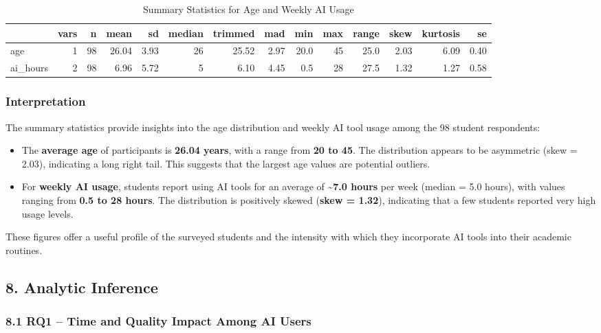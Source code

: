 \documentclass[
]{article}
\providecommand{\tightlist}{%
  \setlength{\itemsep}{0pt}\setlength{\parskip}{0pt}}
\begin{document}
\begin{longtable}[t]{lrrrrrrrrrrrrr}
\caption{\label{tab:descriptive-stats}Summary Statistics for Age and Weekly AI Usage}\\
\toprule
 & vars & n & mean & sd & median & trimmed & mad & min & max & range & skew & kurtosis & se\\
\midrule
age & 1 & 98 & 26.04 & 3.93 & 26 & 25.52 & 2.97 & 20.0 & 45 & 25.0 & 2.03 & 6.09 & 0.40\\
ai\_hours & 2 & 98 & 6.96 & 5.72 & 5 & 6.10 & 4.45 & 0.5 & 28 & 27.5 & 1.32 & 1.27 & 0.58\\
\bottomrule
\end{longtable}

\subsubsection{Interpretation}\label{interpretation}

The summary statistics provide insights into the age distribution and
weekly AI tool usage among the 98 student respondents:

\begin{itemize}
\tightlist
\item
  The \textbf{average age} of participants is \textbf{26.04 years}, with
  a range from \textbf{20 to 45}. The distribution appears to be
  asymmetric (skew = 2.03), indicating a long right tail. This suggests
  that the largest age values are potential outliers.
\item
  For \textbf{weekly AI usage}, students report using AI tools for an
  average of \textbf{\textasciitilde7.0 hours} per week (median = 5.0
  hours), with values ranging from \textbf{0.5 to 28 hours}. The
  distribution is positively skewed (\textbf{skew = 1.32}), indicating
  that a few students reported very high usage levels.
\end{itemize}

These figures offer a useful profile of the surveyed students and the
intensity with which they incorporate AI tools into their academic
routines.

\subsection{8. Analytic Inference}\label{analytic-inference}

\subsubsection{8.1 RQ1 -- Time and Quality Impact Among AI
Users}\label{rq1-time-and-quality-impact-among-ai-users}
\end{document}
